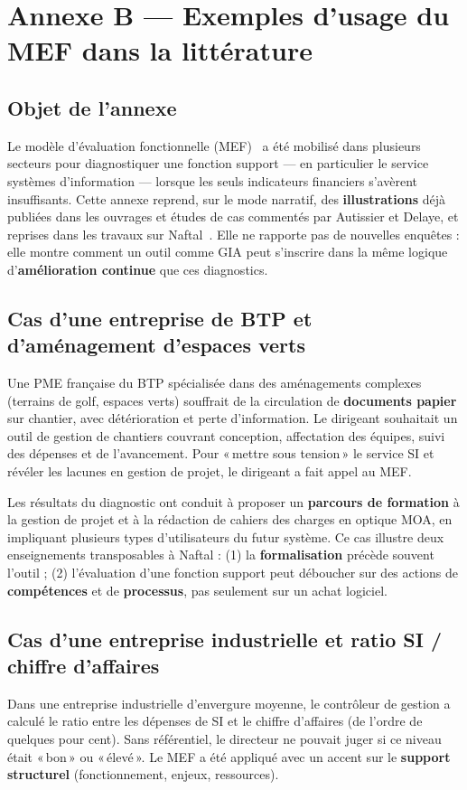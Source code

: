 \chapter{Annexe B — Exemples d'usage du MEF dans la littérature}

\section{Objet de l'annexe}
Le modèle d'évaluation fonctionnelle (MEF)~\cite{autissier2008} a été mobilisé dans plusieurs
secteurs pour diagnostiquer une fonction support — en particulier le service systèmes
d'information — lorsque les seuls indicateurs financiers s'avèrent insuffisants. Cette annexe
reprend, sur le mode narratif, des \textbf{illustrations} déjà publiées dans les ouvrages et études
de cas commentés par Autissier et Delaye, et reprises dans les travaux sur Naftal~\cite{meghari2014}.
Elle ne rapporte pas de nouvelles enquêtes : elle montre comment un outil comme GIA peut s'inscrire
dans la même logique d'\textbf{amélioration continue} que ces diagnostics.

\section{Cas d'une entreprise de BTP et d'aménagement d'espaces verts}
Une PME française du BTP spécialisée dans des aménagements complexes (terrains de golf, espaces
verts) souffrait de la circulation de \textbf{documents papier} sur chantier, avec détérioration et
perte d'information. Le dirigeant souhaitait un outil de gestion de chantiers couvrant conception,
affectation des équipes, suivi des dépenses et de l'avancement. Pour «\,mettre sous tension\,» le
service SI et révéler les lacunes en gestion de projet, le dirigeant a fait appel au MEF.

Les résultats du diagnostic ont conduit à proposer un \textbf{parcours de formation} à la gestion
de projet et à la rédaction de cahiers des charges en optique MOA, en impliquant plusieurs types
d'utilisateurs du futur système. Ce cas illustre deux enseignements transposables à Naftal : (1) la
\textbf{formalisation} précède souvent l'outil ; (2) l'évaluation d'une fonction support peut
déboucher sur des actions de \textbf{compétences} et de \textbf{processus}, pas seulement sur un
achat logiciel.

\section{Cas d'une entreprise industrielle et ratio SI / chiffre d'affaires}
Dans une entreprise industrielle d'envergure moyenne, le contrôleur de gestion a calculé le ratio
entre les dépenses de SI et le chiffre d'affaires (de l'ordre de quelques pour cent). Sans
référentiel, le directeur ne pouvait juger si ce niveau était «\,bon\,» ou «\,élevé\,». Le MEF a été
appliqué avec un accent sur le \textbf{support structurel} (fonctionnement, enjeux, ressources).

